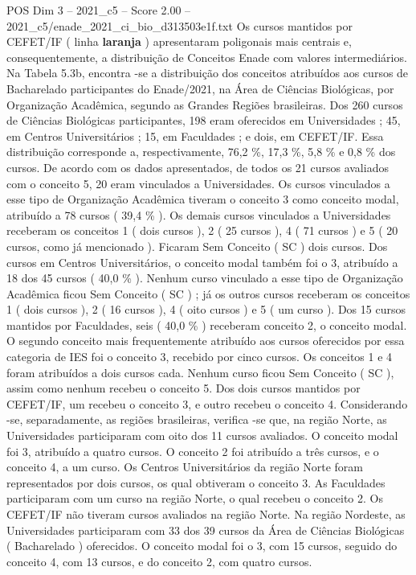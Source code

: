 \begin{textsample}{POS Dim 3 – 2021\_c5 – Score 2.00 – 2021\_c5/enade\_2021\_ci\_bio\_d313503e1f.txt}
Os cursos mantidos por CEFET/IF ( linha \textbf{laranja} ) apresentaram poligonais mais centrais e, consequentemente, a distribuição de Conceitos Enade com valores intermediários.
Na Tabela 5.3b, encontra -se a distribuição dos conceitos atribuídos aos cursos de Bacharelado participantes do Enade/2021, na Área de Ciências Biológicas, por Organização Acadêmica, segundo as Grandes Regiões brasileiras.
Dos 260 cursos de Ciências Biológicas participantes, 198 eram oferecidos em Universidades ; 45, em Centros Universitários ; 15, em Faculdades ; e dois, em CEFET/IF.
Essa distribuição corresponde a, respectivamente, 76,2 \%, 17,3 \%, 5,8 \% e 0,8 \% dos cursos.
De acordo com os dados apresentados, de todos os 21 cursos avaliados com o conceito 5, 20 eram vinculados a Universidades.
Os cursos vinculados a esse tipo de Organização Acadêmica tiveram o conceito 3 como conceito modal, atribuído a 78 cursos ( 39,4 \% ).
Os demais cursos vinculados a Universidades receberam os conceitos 1 ( dois cursos ), 2 ( 25 cursos ), 4 ( 71 cursos ) e 5 ( 20 cursos, como já mencionado ).
Ficaram Sem Conceito ( SC ) dois cursos.
Dos cursos em Centros Universitários, o conceito modal também foi o 3, atribuído a 18 dos 45 cursos ( 40,0 \% ).
Nenhum curso vinculado a esse tipo de Organização Acadêmica ficou Sem Conceito ( SC ) ; já os outros cursos receberam os conceitos 1 ( dois cursos ), 2 ( 16 cursos ), 4 ( oito cursos ) e 5 ( um curso ).
Dos 15 cursos mantidos por Faculdades, seis ( 40,0 \% ) receberam conceito 2, o conceito modal.
O segundo conceito mais frequentemente atribuído aos cursos oferecidos por essa categoria de IES foi o conceito 3, recebido por cinco cursos.
Os conceitos 1 e 4 foram atribuídos a dois cursos cada.
Nenhum curso ficou Sem Conceito ( SC ), assim como nenhum recebeu o conceito 5.
Dos dois cursos mantidos por CEFET/IF, um recebeu o conceito 3, e outro recebeu o conceito 4.
Considerando -se, separadamente, as regiões brasileiras, verifica -se que, na região Norte, as Universidades participaram com oito dos 11 cursos avaliados.
O conceito modal foi 3, atribuído a quatro cursos.
O conceito 2 foi atribuído a três cursos, e o conceito 4, a um curso.
Os Centros Universitários da região Norte foram representados por dois cursos, os qual obtiveram o conceito 3.
As Faculdades participaram com um curso na região Norte, o qual recebeu o conceito 2.
Os CEFET/IF não tiveram cursos avaliados na região Norte.
Na região Nordeste, as Universidades participaram com 33 dos 39 cursos da Área de Ciências Biológicas ( Bacharelado ) oferecidos.
O conceito modal foi o 3, com 15 cursos, seguido do conceito 4, com 13 cursos, e do conceito 2, com quatro cursos.

\end{textsample}
